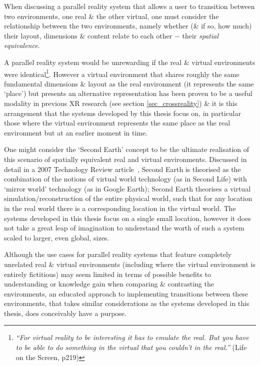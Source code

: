 \newcommand{\turklevrfootnote}{\footnote{\textit{``For virtual reality to be interesting it has to emulate the real. But you have to be able to do something in the virtual that you couldn't in the real.''} (Life on the Screen, p219)}}

When discussing a parallel reality system that allows a user to transition between two environments, one real \& the other virtual, one must consider the relationship between the two environments, namely whether (\& if so, how much) their layout, dimensions \& content relate to each other $-$ their \textit{spatial equivalence}.

A parallel reality system would be unrewarding if the real \& virtual environments were identical\turklevrfootnote{}. However a virtual environment that shares roughly the same fundamental dimensions \& layout as the real environment (it represents the same `place') but presents an alternative representation has been proven to be a useful modality in previous XR research (see section \ref{sec_crossreality}) \& it is this arrangement that the systems developed by this thesis focus on, in particular those where the virtual environment represents the same place as the real environment but at an earlier moment in time.

One might consider the `Second Earth' concept to be the ultimate realisation of this scenario of spatially equivalent real and virtual environments. Discussed in detail in a 2007 Technology Review article~\cite{Roush2007}, Second Earth is theorised as the combination of the notions of virtual world technology (as in Second Life) with `mirror world' technology (as in Google Earth); Second Earth theorises a virtual simulation/reconstruction of the entire physical world, such that for any location in the real world there is a corresponding location in the virtual world. The systems developed in this thesis focus on a single small location, however it does not take a great leap of imagination to understand the worth of such a system scaled to larger, even global, sizes.

Although the use cases for parallel reality systems that feature completely unrelated real \& virtual environments (including where the virtual environment is entirely fictitious) may seem limited in terms of possible benefits to understanding or knowledge gain when comparing \& contrasting the environments, an educated approach to implementing transitions between these environments, that takes similar considerations as the systems developed in this thesis, does conceivably have a purpose.


